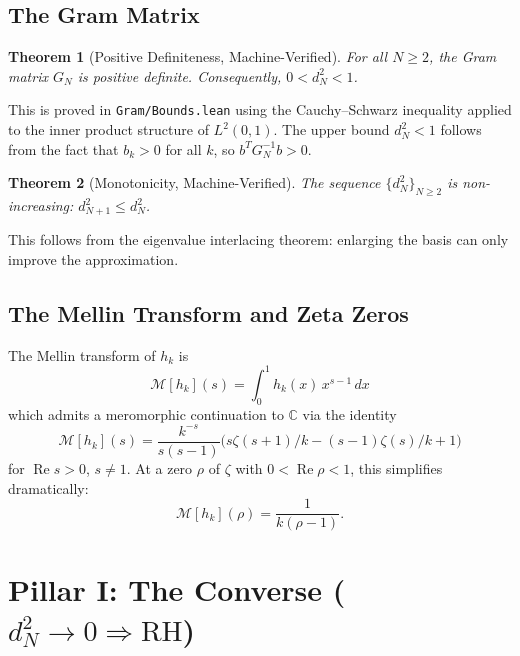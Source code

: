 \documentclass[11pt,a4paper]{article}
\theoremstyle{plain}
\newtheorem{theorem}{Theorem}[section]
\theoremstyle{definition}
\theoremstyle{remark}
\newcommand{\RH}{\mathrm{RH}}
\newcommand{\re}{\operatorname{Re}}
\newcommand{\CC}{\mathbb{C}}
\newcommand{\lean}[1]{\texttt{#1}}
\begin{document}
\subsection{The Gram Matrix}

\begin{theorem}[Positive Definiteness, Machine-Verified]
\label{thm:posdef}
For all $N \geq 2$, the Gram matrix $G_N$ is positive definite.
Consequently, $0 < d_N^2 < 1$.
\end{theorem}

This is proved in \lean{Gram/Bounds.lean} using the
Cauchy--Schwarz inequality applied to the inner product structure of
$L^2(0,1)$. The upper bound $d_N^2 < 1$ follows from the fact that
$b_k > 0$ for all $k$, so $b^T G_N^{-1} b > 0$.

\begin{theorem}[Monotonicity, Machine-Verified]
\label{thm:mono}
The sequence $\{d_N^2\}_{N \geq 2}$ is non-increasing: $d_{N+1}^2 \leq d_N^2$.
\end{theorem}

This follows from the eigenvalue interlacing theorem: enlarging the
basis can only improve the approximation.

\subsection{The Mellin Transform and Zeta Zeros}

The Mellin transform of $h_k$ is
\[
  \mathcal{M}[h_k](s) = \int_0^1 h_k(x)\,x^{s-1}\,dx
\]
which admits a meromorphic continuation to $\CC$ via the identity
\begin{equation}
\label{eq:mellin-frac}
  \mathcal{M}[h_k](s) = \frac{k^{-s}}{s(s-1)} \bigl(
    s\zeta(s+1)/k - (s-1)\zeta(s)/k + 1
  \bigr)
\end{equation}
for $\re s > 0$, $s \neq 1$. At a zero $\rho$ of $\zeta$ with
$0 < \re\rho < 1$, this simplifies dramatically:
\begin{equation}
\label{eq:rank1}
  \mathcal{M}[h_k](\rho) = \frac{1}{k(\rho - 1)}.
\end{equation}

\section{Pillar I: The Converse ($d_N^2 \to 0 \Rightarrow \RH$)}
\label{sec:converse}
\end{document}
